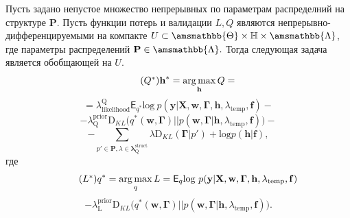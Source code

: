 \begin{theorem}
Пусть задано непустое множество непрерывных по параметрам распределний на структуре $\mathbf{P}$. 
Пусть функции потерь и валидации $L,Q$ являются непрерывно-дифференцируемыми на компакте $U\subset \amsmathbb{\Theta} \times \mathbb{H} \times \amsmathbb{\Lambda}$, где параметры распределений $\mathbf{P} \in \amsmathbb{\Lambda}.$ 
Тогда следующая задача является обобщающей на $U$.
\begin{equation}
\tag{$Q^{*}$}
\label{eq:qopt}
\mathbf{h}^{*} = \argmax_{\mathbf{h}} Q = 
\end{equation}
\[
= {\lambda_\text{likelihood}^\text{Q}\mathsf{E}_{{q}^{*}} \text{log}~{p(\mathbf{y} | \mathbf{X}, \mathbf{w},\boldsymbol{\Gamma}, \mathbf{h}, \lambda_\text{temp}, \mathbf{f})}}
 -\]
\vspace{-0.3cm}
\[- {\lambda^\text{prior}_\text{Q}\text{D}_{KL}\bigl( q^{*}(\mathbf{w}, \boldsymbol{\Gamma}) || p(\mathbf{w}, \boldsymbol{\Gamma} |\mathbf{h}, \lambda_{\text{temp}},\mathbf{f}) \bigr)}  -\]
\vspace{-0.3cm}
\[
 - {\sum_{p' \in \mathbf{P}, \lambda \in \boldsymbol{\lambda}^\text{struct}_\text{Q}} \lambda\text{D}_{KL}(\boldsymbol{\Gamma} | p') + \text{log}p(\mathbf{h}|\mathbf{f})}, 
\]
где 
\begin{equation}
\tag{$L^{*}$}
{q}^{*} = \argmax_{q} L = 
{\mathsf{E}_q \text{log}~{p(\mathbf{y} | \mathbf{X}, \mathbf{w}, \boldsymbol{\Gamma}, \mathbf{h}, \lambda_{\text{temp}}, \mathbf{f})}}
\end{equation}
\vspace{-0.3cm}
\[- {\lambda^\text{prior}_\text{L}\text{D}_{KL}\bigl( q^{*}(\mathbf{w}, \boldsymbol{\Gamma}) || p(\mathbf{w}, \boldsymbol{\Gamma} |\mathbf{h}, \lambda_{\text{temp}},\mathbf{f}) \bigr)}.
\]
\end{theorem}
